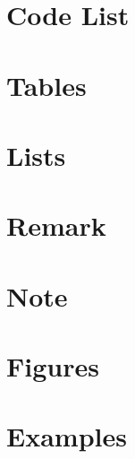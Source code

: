 \documentclass[11pt,dark=4508]{QIBook}
\begin{document}
\section{Code List}
\section{Tables}
\section{Lists}
\section{Remark}
\section{Note}
\section{Figures}
\section{Examples}
\end{document}
